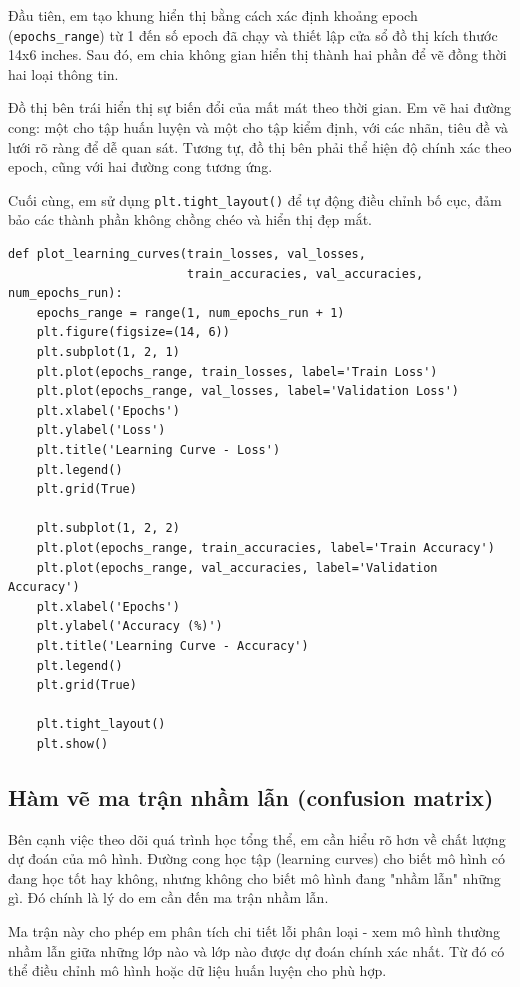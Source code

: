 \documentclass[12pt, a4paper, openany]{report}
\begin{document}
Đầu tiên, em tạo khung hiển thị bằng cách xác định khoảng epoch (\texttt{epochs\_range}) từ 1 đến số epoch đã chạy và thiết lập cửa sổ đồ thị kích thước 14x6 inches. Sau đó, em chia không gian hiển thị thành hai phần để vẽ đồng thời hai loại thông tin. 

Đồ thị bên trái hiển thị sự biến đổi của mất mát theo thời gian. Em vẽ hai đường cong: một cho tập huấn luyện và một cho tập kiểm định, với các nhãn, tiêu đề và lưới rõ ràng để dễ quan sát. Tương tự, đồ thị bên phải thể hiện độ chính xác theo epoch, cũng với hai đường cong tương ứng. 

Cuối cùng, em sử dụng \texttt{plt.tight\_layout()} để tự động điều chỉnh bố cục, đảm bảo các thành phần không chồng chéo và hiển thị đẹp mắt.

\begin{verbatim}
def plot_learning_curves(train_losses, val_losses,
                         train_accuracies, val_accuracies, num_epochs_run):
    epochs_range = range(1, num_epochs_run + 1)
    plt.figure(figsize=(14, 6))
    plt.subplot(1, 2, 1)
    plt.plot(epochs_range, train_losses, label='Train Loss')
    plt.plot(epochs_range, val_losses, label='Validation Loss')
    plt.xlabel('Epochs')
    plt.ylabel('Loss')
    plt.title('Learning Curve - Loss')
    plt.legend()
    plt.grid(True)

    plt.subplot(1, 2, 2)
    plt.plot(epochs_range, train_accuracies, label='Train Accuracy')
    plt.plot(epochs_range, val_accuracies, label='Validation Accuracy')
    plt.xlabel('Epochs')
    plt.ylabel('Accuracy (%)')
    plt.title('Learning Curve - Accuracy')
    plt.legend()
    plt.grid(True)
    
    plt.tight_layout()
    plt.show()
\end{verbatim}

\subsection{Hàm vẽ ma trận nhầm lẫn (confusion matrix)}
Bên cạnh việc theo dõi quá trình học tổng thể, em cần hiểu rõ hơn về chất lượng dự đoán của mô hình. Đường cong học tập (learning curves) cho biết mô hình có đang học tốt hay không, nhưng không cho biết mô hình đang "nhầm lẫn" những gì. Đó chính là lý do em cần đến ma trận nhầm lẫn.

Ma trận này cho phép em phân tích chi tiết lỗi phân loại - xem mô hình thường nhầm lẫn giữa những lớp nào và lớp nào được dự đoán chính xác nhất. Từ đó có thể điều chỉnh mô hình hoặc dữ liệu huấn luyện cho phù hợp.
\end{document}
